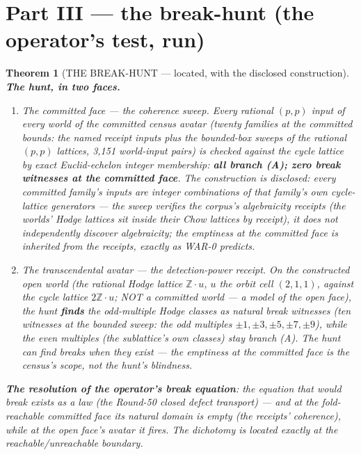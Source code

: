 \documentclass[11pt]{article}
\newtheorem{theorem}{Theorem}[section]
\begin{document}
\section{Part III --- the break-hunt (the operator's test, run)}

\begin{theorem}[THE BREAK-HUNT --- located, with the disclosed construction]
\label{thm:hunt}
\textbf{The hunt, in two faces.}
\begin{enumerate}
\item[\textbf{(a)}] \emph{The committed face --- the coherence sweep.} Every rational $(p,p)$ input of every world of the committed census avatar (twenty families at the committed bounds: the named receipt inputs plus the bounded-box sweeps of the rational $(p,p)$ lattices, 3{,}151 world-input pairs) is checked against the cycle lattice by exact Euclid-echelon integer membership: \textbf{all branch (A); zero break witnesses at the committed face}. \emph{The construction is disclosed}: every committed family's inputs are integer combinations of that family's own cycle-lattice generators --- the sweep \emph{verifies the corpus's algebraicity receipts} (the worlds' Hodge lattices sit inside their Chow lattices by receipt), it does not independently discover algebraicity; the emptiness at the committed face is inherited from the receipts, exactly as WAR-0 predicts.
\item[\textbf{(b)}] \emph{The transcendental avatar --- the detection-power receipt.} On the constructed open world (the rational Hodge lattice $\mathbb Z\!\cdot\!u$, $u$ the orbit cell $(2,1,1)$, against the cycle lattice $2\mathbb Z\!\cdot\!u$; NOT a committed world --- a model of the open face), the hunt \textbf{finds} the odd-multiple Hodge classes as natural break witnesses (ten witnesses at the bounded sweep: the odd multiples $\pm1,\pm3,\pm5,\pm7,\pm9$), while the even multiples (the sublattice's own classes) stay branch (A). \emph{The hunt can find breaks when they exist} --- the emptiness at the committed face is the census's scope, not the hunt's blindness.
\end{enumerate}
\textbf{The resolution of the operator's break equation}: the equation that would break \emph{exists as a law} (the Round-50 closed defect transport) --- and at the fold-reachable committed face its natural domain is empty (the receipts' coherence), while at the open face's avatar it fires. The dichotomy is \emph{located exactly at the reachable/unreachable boundary}.
\end{theorem}
\end{document}
